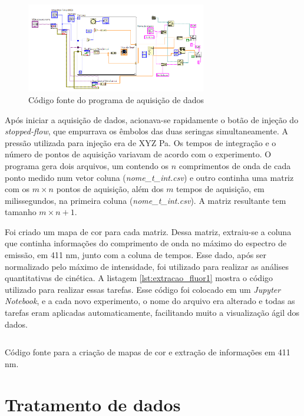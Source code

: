 			\begin{figure}[h]
				\centering
				\includegraphics[width=0.7\textwidth]{imagens/fluor/gravacao_dados}
				\caption{Código fonte do programa de aquisição de dados}
				\label{fig:fluor_gravacaodados}
			\end{figure}

			Após iniciar a aquisição de dados, acionava-se rapidamente o botão de injeção do \emph{stopped-flow}, que empurrava os êmbolos das duas seringas simultaneamente. A pressão utilizada para injeção era de XYZ Pa. Os tempos de integração e o número de pontos de aquisição variavam de acordo com o experimento. O programa gera dois arquivos, um contendo os \(n\) comprimentos de onda de cada ponto medido num vetor coluna (\emph{nome\_t\_int.csv}) e outro continha uma matriz com os \(m \times n\) pontos de aquisição, além dos \(m\) tempos de aquisição, em milissegundos, na primeira coluna (\emph{nome\_t\_int.csv}). A matriz resultante tem tamanho \(m\times n+1\).
			
			Foi criado um mapa de cor para cada matriz. Dessa matriz, extraiu-se a coluna que continha informações do comprimento de onda no máximo do espectro de emissão, em 411 nm, junto com a coluna de tempos. Esse dado, após ser normalizado pelo máximo de intensidade, foi utilizado para realizar as análises quantitativas de cinética. A listagem \ref{lst:extracao_fluor1} mostra o código utilizado para realizar essas tarefas. Esse código foi colocado em um \emph{Jupyter Notebook}, e a cada novo experimento, o nome do arquivo era alterado e todas as tarefas eram aplicadas automaticamente, facilitando muito a visualização ágil dos dados.
			
			\begin{listing}[h]
				\inputminted{python}{./python/fluor_plot_inicial.py}
				\caption{Código fonte para a criação de mapas de cor e extração de informações em 411 nm.}
				\label{lst:extracao_fluor1}
			\end{listing}
			
		\section{Tratamento de dados}
		

